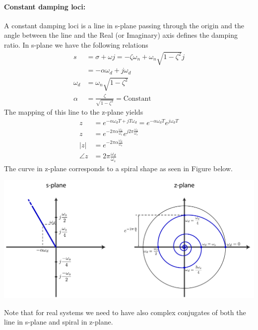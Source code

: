 \documentclass[twoside]{article}
\begin{document}
\paragraph{Constant damping loci:} A constant damping loci 
is a line in s-plane passing through the origin and the angle
between the line and the Real (or Imaginary) axis defines the damping 
ratio. In s-plane we have the following relations
%
\begin{align*}
s &= \sigma +\omega j = -\zeta \omega_n + \omega_n \sqrt{1 - \zeta^2} j \\
&= -\alpha \omega_d + j \omega_d
\\
\omega_d &=  \omega_n \sqrt{1 - \zeta^2}
\\
\alpha &= \frac{\zeta}{\sqrt{1 - \zeta^2}} = \mathrm{Constant} 
\end{align*}
%
The mapping of this line to the z-plane yields
%
\begin{align*}
z &= e^{-\alpha \omega_d T + j T \omega_d} = e^{-\alpha \omega_d T} 
  e^{j \omega_d T}\\
z &= e^{-2 \pi \alpha \frac{\omega_d}{\omega_s}} 
  e^{j 2 \pi \frac{\omega_d}{\omega_s}}
\\
|z| &= e^{-2 \pi \alpha \frac{\omega_d}{\omega_s}}
\\
\angle z &= 2 \pi \frac{\omega_d}{\omega_s}
\end{align*}
%
The curve in z-plane corresponds to a spiral shape as seen 
in Figure below.
%
    \begin{center}
\begin{minipage}[h]{\linewidth}
    \begin{center}
      \includegraphics[width=\textwidth]{damping}
    \end{center}
\end{minipage}
    \end{center}
%
Note that for real systems we need to have also complex conjugates 
of both the line in s-plane and spiral in z-plane.
\end{document}
